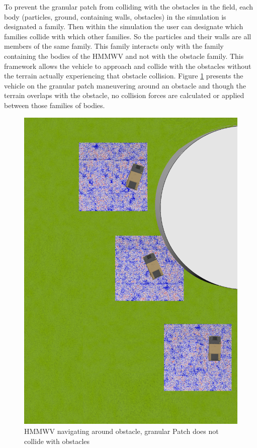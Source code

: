 \documentclass[12pt,onecolumn]{report}
\begin{document}
To prevent the granular patch from colliding with the obstacles in the field, each body (particles, ground, containing walls, obstacles) in the simulation is designated a family. Then within the simulation the user can designate which families collide with which other families. So the particles and their walls are all members of the same family. This family interacts only with the family containing the bodies of the HMMWV and not with the obstacle family. This framework allows the vehicle to approach and collide with the obstacles without the terrain actually experiencing that obstacle collision. Figure \ref{fig:relocationAroundObstacle} presents the vehicle on the granular patch maneuvering around an obstacle and though the terrain overlaps with the obstacle, no collision forces are calculated or applied between those families of bodies.

\begin{figure}
	\centering
	\includegraphics[width=0.8\columnwidth]{Figs/aroundObstacle.png}
	\caption{\small HMMWV navigating around obstacle, granular Patch does not collide with obstacles}
	\label{fig:relocationAroundObstacle}
\end{figure}
\end{document}
